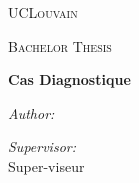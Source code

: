 
\begin{center}
\vspace*{.06\textheight}
{\scshape\LARGE UCLouvain\par}\vspace{1.5cm} %
\textsc{\Large Bachelor Thesis}\\[0.5cm] %

{\huge \bfseries Cas Diagnostique\par}\vspace{0.4cm} %
 
\begin{minipage}[t]{0.4\textwidth}
\begin{flushleft} \large
\emph{Author:}\\
\theauthor %
\end{flushleft}
\end{minipage}
\begin{minipage}[t]{0.4\textwidth}
\begin{flushright} \large
\emph{Supervisor:} \\
Super-viseur %
\end{flushright}
\end{minipage}\\[3cm]
 
 
\vfill
\end{center}